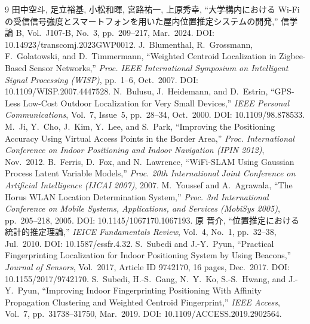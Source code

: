 \documentclass[a4paper,twocolumn]{ltjsarticle}
\begin{document}
\begin{thebibliography}{9}\footnotesize
    田中空斗, 足立裕基, 小松和暉, 宮路祐一, 上原秀幸,
    ``大学構内における Wi-Fi の受信信号強度とスマートフォンを用いた屋内位置推定システムの開発,''
    信学論 B, Vol.~J107-B, No.~3, pp.~209--217, Mar.~2024.
    DOI: 10.14923/transcomj.2023GWP0012.
    J.~Blumenthal, R.~Grossmann, F.~Golatowski, and D.~Timmermann,
    ``Weighted Centroid Localization in Zigbee-Based Sensor Networks,''
    \emph{Proc. IEEE International Symposium on Intelligent Signal Processing (WISP)}, pp.~1--6, Oct.~2007.
    DOI: 10.1109/WISP.2007.4447528.
    N.~Bulusu, J.~Heidemann, and D.~Estrin,
    ``GPS-Less Low-Cost Outdoor Localization for Very Small Devices,''
    \emph{IEEE Personal Communications}, Vol.~7, Issue~5, pp.~28--34, Oct.~2000.
    DOI: 10.1109/98.878533.
    M.~Ji, Y.~Cho, J.~Kim, Y.~Lee, and S.~Park,
    ``Improving the Positioning Accuracy Using Virtual Access Points in the Border Area,''
    \emph{Proc. International Conference on Indoor Positioning and Indoor Navigation (IPIN 2012)}, Nov.~2012.
    B.~Ferris, D.~Fox, and N.~Lawrence,
    ``WiFi-SLAM Using Gaussian Process Latent Variable Models,''
    \emph{Proc. 20th International Joint Conference on Artificial Intelligence (IJCAI 2007)}, 2007.
    M.~Youssef and A.~Agrawala,
    ``The Horus WLAN Location Determination System,''
    \emph{Proc. 3rd International Conference on Mobile Systems, Applications, and Services (MobiSys 2005)}, pp.~205--218, 2005.
    DOI: 10.1145/1067170.1067193.
    原 晋介,
    ``位置推定における統計的推定理論,''
    \emph{IEICE Fundamentals Review}, Vol.~4, No.~1, pp.~32--38, Jul.~2010.
    DOI: 10.1587/essfr.4.32.
    S.~Subedi and J.-Y.~Pyun,
    ``Practical Fingerprinting Localization for Indoor Positioning System by Using Beacons,''
    \emph{Journal of Sensors}, Vol.~2017, Article ID 9742170, 16 pages, Dec.~2017.
    DOI: 10.1155/2017/9742170.
    S.~Subedi, H.-S.~Gang, N.~Y.~Ko, S.-S.~Hwang, and J.-Y.~Pyun,
    ``Improving Indoor Fingerprinting Positioning With Affinity Propagation Clustering and Weighted Centroid Fingerprint,''
    \emph{IEEE Access}, Vol.~7, pp.~31738--31750, Mar.~2019.
    DOI: 10.1109/ACCESS.2019.2902564.
\end{thebibliography}

\clearpage
\appendix
\end{document}
